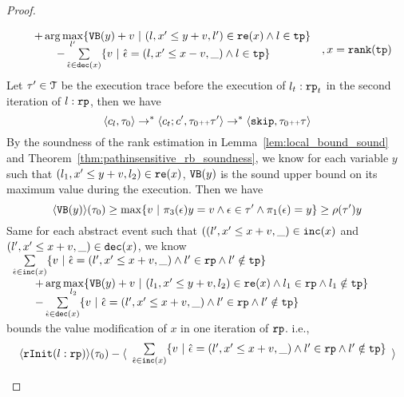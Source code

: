 \begin{proof}
\begin{itemize}
\[\begin{array}{l}
\begin{array}{l}
  + \arg\max\limits_{l' }
     \left\{ \varinvar(y) + v ~\middle\vert~ (l, x' \leq y + v, l') \in \reset(x) \land l \in \tpath\right\}
     \\ \qquad 
    - \sum\limits_{ \absevent \in \dec(x) }\left\{ 
      v ~\middle\vert~ \absevent = (l, x' \leq x - v, \_) \land l \in \tpath 
      \right\}
    \end{array}
  \end{array}
  , x = \locbound(\tpath)
\]
 Let $\mathtt{\tau}' \in \mathcal{T}$ be the execution trace before the execution of $l_t: \mathtt{rp}_t$ in the second iteration of $l:\mathtt{rp}$, then we have
 \[
   \langle c_l, \mathtt{\tau}_0 \rangle \to^* \langle c_t;c', \mathtt{\tau}_0 {\scriptscriptstyle ++} \mathtt{\tau}' \rangle \to^* \langle \mathtt{skip}, \mathtt{\tau}_0 {\scriptscriptstyle ++} \mathtt{\tau} \rangle
 \]
   By the soundness of the rank estimation in Lemma~\ref{lem:local_bound_sound} and Theorem~\ref{thm:pathinsensitive_rb_soundness}, we know 
   for each variable $y$ such that $(l_1, x' \leq y + v, l_2) \in \mathtt{re}(x) $,
   ${\mathtt{VB}}(y)$ is the sound upper bound on its maximum value during the execution. Then we have
   \[
     \config{\varinvar(y)}(\trace_0) \geq \max \left\{ v ~|~  \pi_3(\event) y = v \land \event \in \trace' \land \pi_1(\event) = y\right\}  \geq \env(\trace') y 
   \]
   Same for each abstract event such that $((l', x' \leq x + v, \_) \in \mathtt{inc}(x) $ and $(l', x' \leq x + v, \_) \in \mathtt{dec}(x)$,
   we know 
   $ \begin{array}{l}
     \sum\limits_{\absevent \in \inc(x) }
     \left\{ 
     v ~\middle\vert~ \absevent = (l', x' \leq x + v, \_) \land  l' \in \rprog 
     \land l' \notin \tpath \right\}
     \\ \qquad 
     + \arg\max\limits_{l_2 }
         \left\{ 
           \varinvar(y) + v ~\middle\vert~ 
         (l_1, x' \leq y + v, l_2) \in \reset(x) \land l_1 \in \rprog \land l_1 \notin \tpath
         \right\}
     \\ \qquad 
     - \sum\limits_{ \absevent \in \dec(x) }\left\{ 
     v 
     ~\middle\vert~ \absevent = (l', x' \leq x + v, \_) \land l' \in \rprog \land l' \notin \tpath \right\}
   \end{array}
   $ bounds the value modification of $x$ in one iteration of $\mathtt{rp}$.
 i.e.,
   \[
     \begin{array}{l}
       \config{
       \rfinit(l: \rprog)}(\trace_0)
       -
     \config{
         \begin{array}{l}
           \sum\limits_{\absevent \in \inc(x) }
           \left\{ 
           v ~\middle\vert~ \absevent = (l', x' \leq x + v, \_) \land  l' \in \rprog 
           \land l' \notin \tpath \right\}

\end{array}}
\end{array}\]
\end{itemize}
\end{proof}
